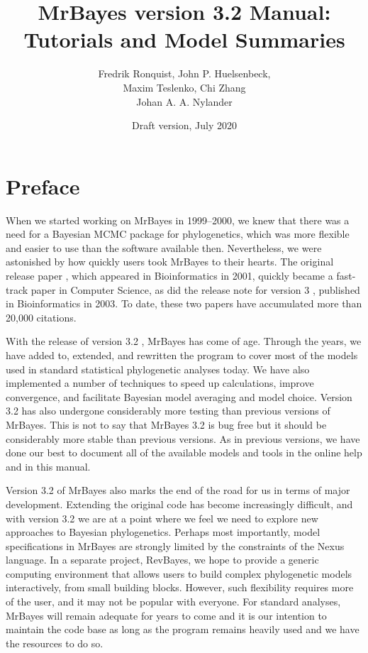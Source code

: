 \documentclass[12pt]{book}
\begin{document}
\title{MrBayes version 3.2 Manual: \\ Tutorials and Model Summaries}

\date{\large Draft version, July 2020}

\author{Fredrik Ronquist, John P. Huelsenbeck, \\ Maxim Teslenko, Chi Zhang \\ Johan A. A. Nylander}

\maketitle

\tableofcontents

\newpage

\frontmatter

\chapter{Preface}\label{preface}

When we started working on MrBayes in 1999--2000, we knew that there was a need for a Bayesian MCMC
package for phylogenetics, which was more flexible and easier to use than the software available
then. Nevertheless, we were astonished by how quickly users took MrBayes to their hearts. The
original release paper \citep{huelsenbeck01c}, which appeared in Bioinformatics in 2001, quickly
became a fast-track paper in Computer Science, as did the release note for version 3
\citep{ronquist03}, published in Bioinformatics in 2003. To date, these two papers have accumulated
more than 20,000 citations.

With the release of version 3.2 \citep{ronquist12a}, MrBayes has come of age. Through the years, we
have added to, extended, and rewritten the program to cover most of the models used in standard
statistical phylogenetic analyses today. We have also implemented a number of techniques to speed
up calculations, improve convergence, and facilitate Bayesian model averaging and model choice.
Version 3.2 has also undergone considerably more testing than previous versions of MrBayes. This
is not to say that MrBayes 3.2 is bug free but it should be considerably more stable than previous
versions. As in previous versions, we have done our best to document all of the available models
and tools in the online help and in this manual.

Version 3.2 of MrBayes also marks the end of the road for us in terms of major development.
Extending the original code has become increasingly difficult, and with version 3.2 we are at a
point where we feel we need to explore new approaches to Bayesian phylogenetics. Perhaps most
importantly, model specifications in MrBayes are strongly limited by the constraints of the Nexus
language. In a separate project, RevBayes, we hope to provide a generic computing environment that
allows users to build complex phylogenetic models interactively, from small building blocks.
However, such flexibility requires more of the user, and it may not be popular with everyone. For
standard analyses, MrBayes will remain adequate for years to come and it is our intention to
maintain the code base as long as the program remains heavily used and we have the resources to do
so.
\end{document}
